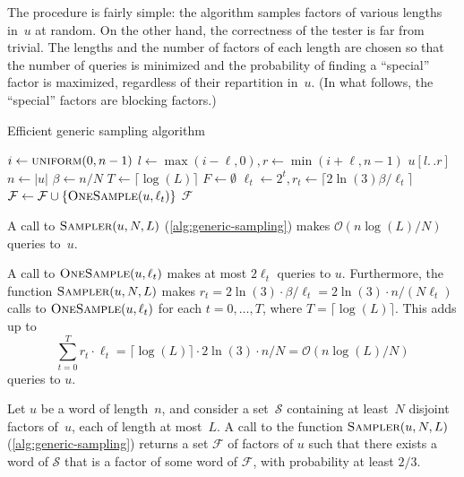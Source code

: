 \documentclass[letterpaper, USenglish, cleveref, autoref, thm-restate, numberwithinsect]{lipics-v2021}
\theoremstyle{theorem}
\theoremstyle{definition}
\newcommand{\cO}{\mathcal{O}}
\newcommand{\dd}{.\,.}
\newcommand{\Ff}{\mathcal{F}}
\newcommand{\Ss}{\mathcal{S}}
\begin{document}
The procedure is fairly simple: the algorithm samples factors of various lengths in~$u$ at random.
On the other hand, the correctness of the tester is far from trivial.
The lengths and the number of factors of each length are chosen so that the number of queries is minimized and the probability of finding a ``special'' factor is maximized, regardless of their repartition in~$u$. (In what follows, the ``special'' factors are blocking factors.)

\begin{algorithm}[htbp]
\caption{Efficient generic sampling algorithm}\label{alg:generic-sampling}
\begin{algorithmic}[1] 
    \State $i\gets \Call{uniform}{0, n-1}$
    \State $l\gets \max(i-\ell, 0), r\gets\min(i+\ell, n-1)$
    \State \Return $u[l\dd  r]$
\EndFunction
{}
\State $n \gets |u|$
\State $\beta \gets n/N$
\State $T \gets \lceil\log(L)\rceil$
\State $F \gets \emptyset$
    \State $\ell_t \gets 2^t, r_t \gets \lceil 2\ln(3)\beta/\ell_t \rceil$
        \State $\Ff \gets \Ff \cup \{\Call{OneSample}{u, \ell_t}\}$
    \EndFor
\EndFor
\State \Return $\Ff$
\EndFunction
\end{algorithmic}
\end{algorithm}

\begin{claim}\label{claim:generic-sampling-alg-complexity}
    A call to $\Call{Sampler}{u, N, L}$ (\cref{alg:generic-sampling}) makes $\cO(n\log(L)/N)$ queries to~$u$.
\end{claim}
\begin{claimproof}
    A call to $\Call{OneSample}{u, \ell_t}$ makes at most $2\ell_t$ queries to $u$.
    Furthermore, the function $\Call{Sampler}{u, N, L}$ makes $r_t = 2\ln(3)\cdot \beta/\ell_t = 2\ln(3)\cdot n/(N\ell_t)$ calls to $\Call{OneSample}{u, \ell_t}$ for each $t = 0,\ldots, T$, where $T = \lceil\log(L)\rceil$.
    This adds up to \[\sum_{t=0}^T  r_t \cdot\ell_t = \lceil\log(L)\rceil \cdot2\ln(3)\cdot n/N = \cO(n\log(L)/N)\] queries to $u$.
\end{claimproof}

\begin{lemma}\label{lemma:generic-sampling-alg}
    Let $u$ be a word of length~$n$, and consider a set~$\Ss$ containing at least~$N$ disjoint factors of~$u$, each of length at most~$L$.
    A call to the function $\Call{Sampler}{u, N, L}$ (\cref{alg:generic-sampling}) returns a set $\Ff$ of factors of $u$ such that there exists a word of $\Ss$ that is a factor of some word of $\Ff$, with probability at least $2/3$.
\end{lemma}
\end{document}
